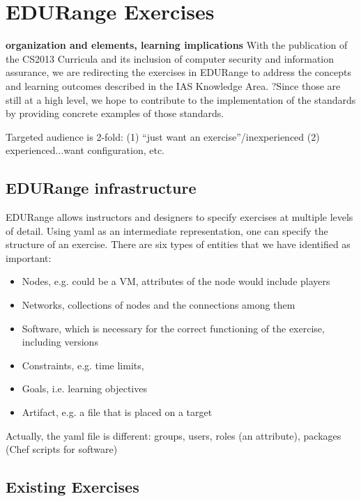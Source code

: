 \section*{EDURange Exercises}

{\bf organization and elements, learning implications}
With the publication of the CS2013 Curricula and its inclusion of computer security and 
information assurance, we are redirecting the exercises in EDURange to address the concepts and learning 
outcomes described in the IAS Knowledge Area.  ?Since those are still at a high level, we hope to contribute
to the implementation of the standards by providing concrete examples of those standards.

 Targeted audience is 2-fold: (1) ``just want an exercise''/inexperienced
 (2) experienced...want configuration, etc.

\subsection{EDURange infrastructure}
EDURange allows instructors and designers to specify exercises at multiple levels of detail.
Using yaml as an intermediate representation, one can specify the structure of an exercise.
There are six types of entities that we have identified as important:
\begin{itemize}
  \item Nodes, e.g. could be a VM, attributes of the node would include players
  \item Networks,  collections of nodes and the connections among them
  \item Software, which is necessary for the correct functioning of the exercise, including versions
  \item Constraints, e.g. time limits, 
  \item Goals, i.e. learning objectives
  \item Artifact, e.g. a file that is placed on a target
\end{itemize}
Actually, the yaml file is different: groups, users, roles (an attribute), packages (Chef scripts for software)


\subsection{Existing Exercises}
